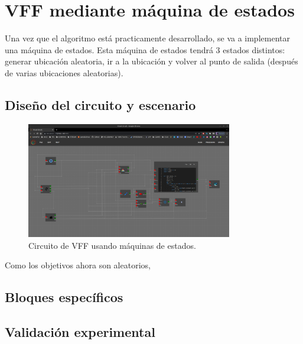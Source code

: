 \section{VFF mediante máquina de estados}
\label{sec:FSM}

Una vez que el algoritmo está practicamente desarrollado, se va a implementar una máquina de estados. Esta máquina de estados tendrá 3 estados distintos: generar ubicación aleatoria, ir a la
ubicación y volver al punto de salida (después de varias ubicaciones aleatorias).

\subsection{Diseño del circuito y escenario}
\label{subsec:dis_bloques_FSM}



\begin{figure} [H]
    \begin{center}
        \includegraphics[width=9cm]{figs/c6/FSM_circuit.png}
    \end{center}
    \caption[Circuito VFF con FSM]{Circuito de VFF usando máquinas de estados.}
    \label{fig:FSM_circ}
\end{figure}


Como los objetivos ahora son aleatorios, 

\subsection{Bloques específicos}
\label{subsec:spec_bloques_FSM}



\subsection{Validación experimental}
\label{subsec:val_exp_FSM}








